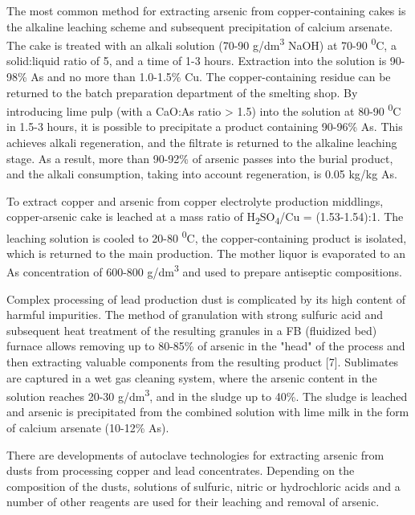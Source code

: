 The most common method for extracting arsenic from copper-containing
cakes is the alkaline leaching scheme and subsequent precipitation of
calcium arsenate. The cake is treated with an alkali solution (70-90
g/dm\textsuperscript{3} NaOH) at 70-90 \textsuperscript{0}C, a
solid:liquid ratio of 5, and a time of 1-3 hours. Extraction into the
solution is 90-98\% As and no more than 1.0-1.5\% Cu. The
copper-containing residue can be returned to the batch preparation
department of the smelting shop. By introducing lime pulp (with a CaO:As
ratio \textgreater{} 1.5) into the solution at 80-90
\textsuperscript{0}C in 1.5-3 hours, it is possible to precipitate a
product containing 90-96\% As. This achieves alkali regeneration, and
the filtrate is returned to the alkaline leaching stage. As a result,
more than 90-92\% of arsenic passes into the burial product, and the
alkali consumption, taking into account regeneration, is 0.05 kg/kg As.

To extract copper and arsenic from copper electrolyte production
middlings, copper-arsenic cake is leached at a mass ratio of
H\textsubscript{2}SO\textsubscript{4}/Cu = (1.53-1.54):1. The leaching
solution is cooled to 20-80 \textsuperscript{0}C, the copper-containing
product is isolated, which is returned to the main production. The
mother liquor is evaporated to an As concentration of 600-800
g/dm\textsuperscript{3} and used to prepare antiseptic compositions.

Complex processing of lead production dust is complicated by its high
content of harmful impurities. The method of granulation with strong
sulfuric acid and subsequent heat treatment of the resulting granules in
a FB (fluidized bed) furnace allows removing up to 80-85\% of arsenic in
the "head" of the process and then extracting valuable components from
the resulting product {[}7{]}. Sublimates are captured in a wet gas
cleaning system, where the arsenic content in the solution reaches 20-30
g/dm\textsuperscript{3}, and in the sludge up to 40\%. The sludge is
leached and arsenic is precipitated from the combined solution with lime
milk in the form of calcium arsenate (10-12\% As).

There are developments of autoclave technologies for extracting arsenic
from dusts from processing copper and lead concentrates. Depending on
the composition of the dusts, solutions of sulfuric, nitric or
hydrochloric acids and a number of other reagents are used for their
leaching and removal of arsenic.

